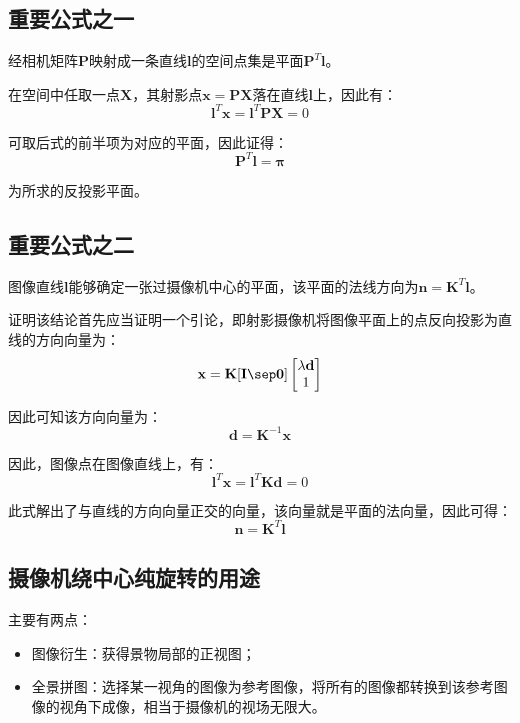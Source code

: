 \documentclass[11pt]{article}
\begin{document}
\subsection{重要公式之一}
{\heiti 经相机矩阵$\mathbf{P}$映射成一条直线$\mathbf{l}$的空间点集是平面$\mathbf{P}^T\mathbf{l}$}。\par
{}\par
在空间中任取一点$\mathbf{X}$，其射影点$\mathbf{x=PX}$落在直线$\mathbf{l}$上，因此有：
\begin{equation*}
  \mathbf{l}^T\mathbf{x}=\mathbf{l}^T\mathbf{PX}=0
\end{equation*}\par
可取后式的前半项为对应的平面，因此证得：
\begin{equation*}
  \mathbf{P}^T\mathbf{l}=\mathbold{\pi}
\end{equation*}\par
为所求的反投影平面。
\subsection{重要公式之二}
{\heiti 图像直线$\mathbf{l}$能够确定一张过摄像机中心的平面，该平面的法线方向为$\mathbf{n=K^\mathit{T}l}$}。\par
{}\par
证明该结论首先应当证明一个引论，即射影摄像机将图像平面上的点反向投影为直线的方向向量为：
\begin{equation*}
  \mathbf{x}=\mathbf{K[I\sep 0]}\begin{bmatrix}
    \lambda\mathbf{d} \\1
  \end{bmatrix}
\end{equation*}\par
因此可知该方向向量为：
\begin{equation*}
  \mathbf{d}=\mathbf{K}^{-1}\mathbf{x}
\end{equation*}\par
因此，图像点在图像直线上，有：
\begin{equation*}
  \mathbf{l^\mathit{T}x}=\mathbf{l^\mathit{T}K}\mathbf{d}=0
\end{equation*}\par
此式解出了与直线的方向向量正交的向量，该向量就是平面的法向量，因此可得：
\begin{equation*}
  \mathbf{n}=\mathbf{K}^T\mathbf{l}
\end{equation*}\par
\subsection{摄像机绕中心纯旋转的用途}
主要有两点：
\begin{itemize}
  \item 图像衍生：获得景物局部的正视图；
  \item 全景拼图：选择某一视角的图像为参考图像，将所有的图像都转换到该参考图像的视角下成像，相当于摄像机的视场无限大。
\end{itemize}
\end{document}
